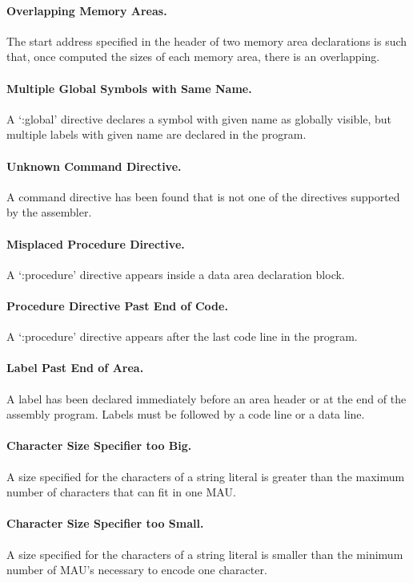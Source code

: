 \documentclass[a4paper,twoside]{tceusermanual}
\begin{document}
\paragraph{Overlapping Memory Areas.}
The start address specified in the header of two memory area declarations is
such that, once computed the sizes of each memory area, there is an
overlapping.

\paragraph{Multiple Global Symbols with Same Name.}
A `:global' directive declares a symbol with given name as globally visible,
but multiple labels with given name are declared in the program.

\paragraph{Unknown Command Directive.}
A command directive has been found that is not one of the directives
supported by the assembler.

\paragraph{Misplaced Procedure Directive.}
A `:procedure' directive appears inside a data area declaration block.

\paragraph{Procedure Directive Past End of Code.}
A `:procedure' directive appears after the last code line in the program.

\paragraph{Label Past End of Area.}
A label has been declared immediately before an area header or at the end of
the assembly program. Labels must be followed by a code line or a data line.

\paragraph{Character Size Specifier too Big.}
A size specified for the characters of a string literal is greater than the
maximum number of characters that can fit in one MAU.

\paragraph{Character Size Specifier too Small.}
A size specified for the characters of a string literal is smaller than the
minimum number of MAU's necessary to encode one character.
\end{document}
